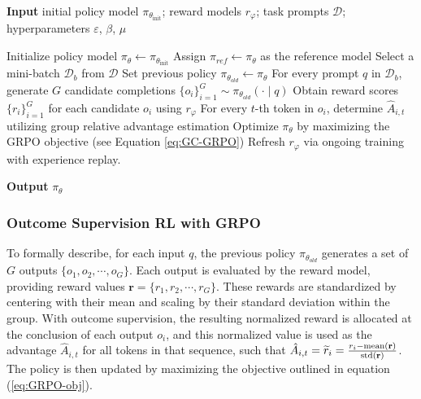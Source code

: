 \begin{algorithm}[t]
  \small
  \caption{Iterative Group Relative Policy Optimization}
  \textbf{Input} initial policy model $\pi_{\theta_{\text{init}}}$; reward models $r_\varphi$; task prompts $\mathcal{D}$; 
  hyperparameters $\varepsilon$, $\beta$, $\mu$
  \begin{algorithmic}[1]
    \State Initialize policy model $\pi_\theta \leftarrow \pi_{\theta_{\text{init}}}$
       \State Assign $\pi_{ref} \leftarrow \pi_{\theta}$ as the reference model
      \State Select a mini-batch $\mathcal{D}_b$ from $\mathcal{D}$
      \State Set previous policy $\pi_{\theta_{old}} \leftarrow \pi_{\theta}$ 
      \State For every prompt $q$ in $\mathcal{D}_b$, generate $G$ candidate completions $\{o_i\}_{i=1}^G \sim \pi_{\theta_{old}} (\cdot \mid q) $
      \State Obtain reward scores $\{r_i\}_{i=1}^{G}$ for each candidate $o_i$ using $r_{\varphi}$ 
      \State For every $t$-th token in $o_i$, determine $\hat{A}_{i,t}$ utilizing group relative advantage estimation
        \State Optimize $\pi_{\theta}$ by maximizing the GRPO objective (see Equation \ref{eq:GC-GRPO})
      \EndFor
    \EndFor \State Refresh $r_\varphi$ via ongoing training with experience replay.
    \EndFor 
  \end{algorithmic}
  \textbf{Output} $\pi_\theta$
  \label{alg:iter-grpo}
\end{algorithm}

\subsubsection{Outcome Supervision RL with GRPO} 
To formally describe, for each input $q$, the previous policy $\pi_{\theta_{old}}$ generates a set of $G$ outputs $\{o_1, o_2, \cdots, o_G\}$. Each output is evaluated by the reward model, providing reward values $\mathbf{r}=\{r_1, r_2, \cdots, r_G\}$. These rewards are standardized by centering with their mean and scaling by their standard deviation within the group. With outcome supervision, the resulting normalized reward is allocated at the conclusion of each output $o_i$, and this normalized value is used as the advantage $\hat{A}_{i, t}$ for all tokens in that sequence, such that $\hat{A}_{i, t} = \widetilde{r}_i = \frac{r_i- {\rm mean}(\mathbf{r})}{{\rm std}(\mathbf{r})}$. The policy is then updated by maximizing the objective outlined in equation (\ref{eq:GRPO-obj}).

